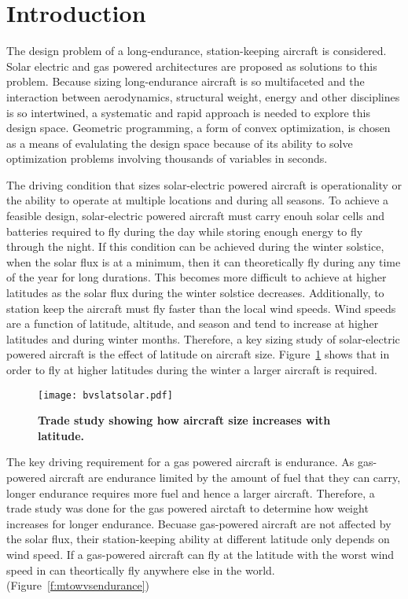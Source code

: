\documentclass[]{aiaa-tc}%
\begin{document}
\section{Introduction}

The design problem of a long-endurance, station-keeping aircraft is considered.
Solar electric and gas powered architectures are proposed as solutions to this problem.
Because sizing long-endurance aircraft is so multifaceted and the interaction between aerodynamics, structural weight, energy and other disciplines is so intertwined, a systematic and rapid approach is needed to explore this design space.
Geometric programming, a form of convex optimization, is chosen as a means of evalulating the design space because of its ability to solve optimization problems involving thousands of variables in seconds.  

The driving condition that sizes solar-electric powered aircraft is operationality or the ability to operate at multiple locations and during all seasons.  
To achieve a feasible design, solar-electric powered aircraft must carry enouh solar cells and batteries required to fly during the day while storing enough energy to fly through the night. 
If this condition can be achieved during the winter solstice, when the solar flux is at a minimum, then it can theoretically fly during any time of the year for long durations. 
This becomes more difficult to achieve at higher latitudes as the solar flux during the winter solstice decreases.  
Additionally, to station keep the aircraft must fly faster than the local wind speeds.  
Wind speeds are a function of latitude, altitude, and season and tend to increase at higher latitudes and during winter months. 
Therefore, a key sizing study of solar-electric powered aircraft is the effect of latitude on aircraft size.  
Figure~\ref{f:bvslatsolar} shows that in order to fly at higher latitudes during the winter a larger aircraft is required. 

\begin{figure}[H]
	\begin{center}
	\texttt{[image: bvslatsolar.pdf]}
    \caption{ \textbf{ Trade study showing how aircraft size increases with latitude.  }}
	\label{f:bvslatsolar}
	\end{center}
\end{figure}

The key driving requirement for a gas powered aircraft is endurance.  
As gas-powered aircraft are endurance limited by the amount of fuel that they can carry, longer endurance requires more fuel and hence a larger aircraft.  
Therefore, a trade study was done for the gas powered airctaft to determine how weight increases for longer endurance.
Becuase gas-powered aircraft are not affected by the solar flux, their station-keeping ability at different latitude only depends on wind speed. 
If a gas-powered aircraft can fly at the latitude with the worst wind speed in can theortically fly anywhere else in the world.  
 (Figure~\ref{f:mtowvsendurance}) 
\end{document}
